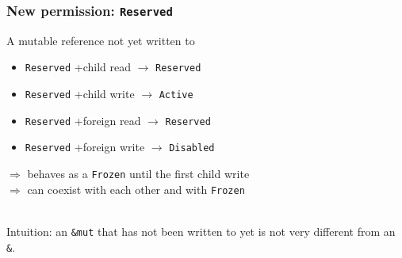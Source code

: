 \begin{frame}
    \frametitle{New permission: \texttt{Reserved}}
    A mutable reference not yet written to
    \begin{itemize}
        \item \texttt{Reserved} +child read \(\to\) \texttt{Reserved}
        \item \texttt{Reserved} +child write \(\to\) \texttt{Active}
        \item \texttt{Reserved} +foreign read \(\to\) \texttt{Reserved}
        \item \texttt{Reserved} +foreign write \(\to\) \texttt{Disabled}
    \end{itemize}
    \(\Rightarrow\) behaves as a \texttt{Frozen} until the first child write\\
    \(\Rightarrow\) can coexist with each other and with \texttt{Frozen}~\\~\\

    \begin{block}{}
        Intuition: an \texttt{\&mut} that has not been written to yet is not very
        different from an \texttt{\&}.
    \end{block}
\end{frame}

